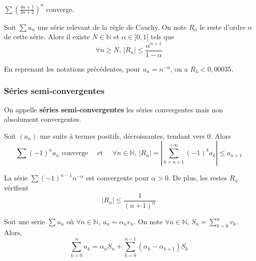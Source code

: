 	\begin{example}
		$\sum \left( \frac{4n+1}{3n+2} \right)^{n}$ converge.
	\end{example}


	\begin{proposition}
		Soit $\sum u_n$ une série relevant de la règle de Cauchy. On note $R_n$ le reste d'ordre $n$ de cette série. Alors il existe $N \in \mathbb{N}$ et $\alpha \in ]0,1[$ tels que
		\[ \forall n \geq N, \, |R_n| \leq \frac{\alpha^{n+1}}{1-\alpha} \]
	\end{proposition}

	\begin{example}
		En reprenant les notations précédentes, pour $u_n = n^{-n}$, on a $R_4 < 0,00035$.
	\end{example}

	\subsubsection{Séries semi-convergentes}


	\begin{definition}
		On appelle \textbf{séries semi-convergentes} les séries convergentes mais non absolument convergentes.
	\end{definition}

	\begin{theorem}
		Soit $(a_n)$ une suite à termes positifs, décroissantes, tendant vers $0$. Alors
		\[ \sum (-1)^n a_n \text{ converge} \quad \text{ et } \quad \forall n \in \mathbb{N}, \, |R_n| = \left| \sum_{k=n+1}^{+\infty} (-1)^k a_k \right| \leq a_{n+1} \]
	\end{theorem}


	\begin{example}
		La série $\sum (-1)^{n-1} n^{-\alpha}$ est convergente pour $\alpha > 0$. De plus, les restes $R_n$ vérifient
		\[ |R_n| \leq \frac{1}{(n+1)^\alpha} \]
	\end{example}


	\begin{proposition}
		Soit une série $\sum u_n$ où $\forall n \in \mathbb{N}, \, u_n = \alpha_n v_n$. On note $\forall n \in \mathbb{N}, \, S_n = \sum_{k=0}^n v_k$. Alors,
		\[ \sum_{k=0}^n u_k = \alpha_n S_n + \sum_{k=0}^{n-1} (\alpha_k - \alpha_{k+1}) S_k \]
	\end{proposition}


